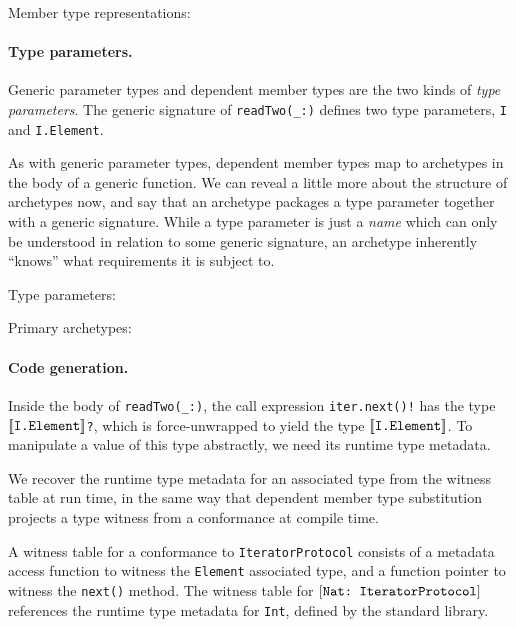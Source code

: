 \documentclass[../generics]{subfiles}
\begin{document}
\begin{MoreDetails}
\item Member type representations: 
\end{MoreDetails}

\paragraph{Type parameters.} Generic parameter types and dependent member types are the two kinds of \emph{type parameters}. The generic signature of \verb|readTwo(_:)| defines two type parameters, \texttt{I} and \texttt{I.Element}.

As with generic parameter types, dependent member types map to archetypes in the body of a generic function. We can reveal a little more about the structure of archetypes now, and say that an archetype packages a type parameter together with a generic signature. While a type parameter is just a \emph{name} which can only be understood in relation to some generic signature, an archetype inherently ``knows'' what requirements it is subject to.

\begin{MoreDetails}
\item Type parameters: 
\item Primary archetypes: 
\end{MoreDetails}

\paragraph{Code generation.}
Inside the body of \verb|readTwo(_:)|, the call expression \verb|iter.next()!| has the type \texttt{$[\![\texttt{I.Element}]\!]$?}, which is force-unwrapped to yield the type $[\![\texttt{I.Element}]\!]$. To manipulate a value of this type abstractly, we need its runtime type metadata.

We recover the runtime type metadata for an associated type from the witness table at run time, in the same way that dependent member type substitution projects a type witness from a conformance at compile time.

A witness table for a conformance to \texttt{IteratorProtocol} consists of a metadata access function to witness the \texttt{Element} associated type, and a function pointer to witness the \texttt{next()} method. The witness table for $[\texttt{Nat:~IteratorProtocol}]$ references the runtime type metadata for \texttt{Int}, defined by the standard library.
\end{document}

